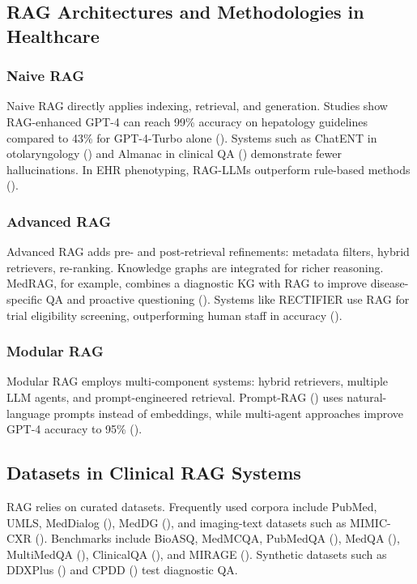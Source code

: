 \subsection{RAG Architectures and Methodologies in Healthcare}

\subsubsection{Naive RAG}
Naive RAG directly applies indexing, retrieval, and generation. Studies show RAG-enhanced GPT-4 can reach 99\% accuracy on hepatology guidelines compared to 43\% for GPT-4-Turbo alone (\citep{li2024liversa}). Systems such as ChatENT in otolaryngology (\citep{zhang2024chatent}) and Almanac in clinical QA (\citep{singhal2023almanac}) demonstrate fewer hallucinations. In EHR phenotyping, RAG-LLMs outperform rule-based methods (\citep{wu2024ragphenotype}).

\subsubsection{Advanced RAG}
Advanced RAG adds pre- and post-retrieval refinements: metadata filters, hybrid retrievers, re-ranking. Knowledge graphs are integrated for richer reasoning. MedRAG, for example, combines a diagnostic KG with RAG to improve disease-specific QA and proactive questioning (\citep{zhao2025medrag}). Systems like RECTIFIER use RAG for trial eligibility screening, outperforming human staff in accuracy (\citep{wang2024rectifier}).

\subsubsection{Modular RAG}
Modular RAG employs multi-component systems: hybrid retrievers, multiple LLM agents, and prompt-engineered retrieval. Prompt-RAG (\citep{kim2024promptrag}) uses natural-language prompts instead of embeddings, while multi-agent approaches improve GPT-4 accuracy to 95\% (\citep{sun2025agenticrag}).

\subsection{Datasets in Clinical RAG Systems}

RAG relies on curated datasets. Frequently used corpora include PubMed, UMLS, MedDialog (\citep{chen2020meddialog}), MedDG (\citep{li2020meddg}), and imaging-text datasets such as MIMIC-CXR (\citep{johnson2019mimiccxr}). Benchmarks include BioASQ, MedMCQA, PubMedQA (\citep{jin2019pubmedqa}), MedQA (\citep{jin2021medqa}), MultiMedQA (\citep{singhal2023multimedqa}), ClinicalQA (\citep{abacha2021nlmclinicalqa}), and MIRAGE (\citep{zhu2023mirage}). Synthetic datasets such as DDXPlus (\citep{liu2023ddxplus}) and CPDD (\citep{zhao2025medrag}) test diagnostic QA.

